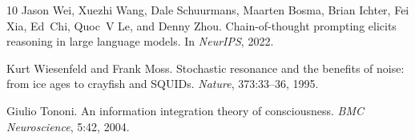 \documentclass[10pt]{article}
\begin{document}
\begin{thebibliography}{10}
Jason Wei, Xuezhi Wang, Dale Schuurmans, Maarten Bosma, Brian Ichter, Fei Xia, Ed~Chi, Quoc~V Le, and Denny Zhou.
\newblock Chain-of-thought prompting elicits reasoning in large language models.
\newblock In \textit{NeurIPS}, 2022.

Kurt Wiesenfeld and Frank Moss.
\newblock Stochastic resonance and the benefits of noise: from ice ages to crayfish and SQUIDs.
\newblock \textit{Nature}, 373:33--36, 1995.

Giulio Tononi.
\newblock An information integration theory of consciousness.
\newblock \textit{BMC Neuroscience}, 5:42, 2004.

\end{thebibliography}
\end{document}
